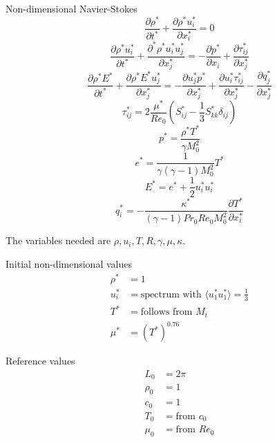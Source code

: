 \documentclass[oneside,a4paper,11pt]{report}
\begin{document}
Non-dimensional Navier-Stokes
\begin{equation}
\frac{\partial \rho^*}{\partial t^*} + \frac{\partial \rho^* u^*_i}{\partial x^*_i} = 0
\end{equation}
\begin{equation}
\frac{\partial \rho^* u^*_i}{\partial t^*} + \frac{\partial^* \rho^* u^*_i u^*_j}{\partial x^*_j} = -\frac{\partial p^*}{\partial x_i} + \frac{\partial \tau^*_{ij}}{\partial x^*_j}
\end{equation}
\begin{equation}
\frac{\partial \rho^* E^*}{\partial t^*} + \frac{\partial \rho^* E^* u^*_j}{\partial x^*_j} = -\frac{\partial u^*_j p^*}{\partial x^*_j} + \frac{\partial u^*_i \tau^*_{ij}}{\partial x^*_j} - \frac{\partial q^*_j}{\partial x^*_j}
\end{equation}
\begin{equation}
\tau^*_{ij} = 2 \frac{\mu^*}{Re_0} \left (S^*_{ij} - \frac{1}{3} S^*_{kk} \delta_{ij} \right )
\end{equation}
\begin{equation}
p^* = \frac{\rho^* T^*}{\gamma M_0^2}
\end{equation}
\begin{equation}
e^* = \frac{1}{\gamma (\gamma - 1) M_0^2} T^*
\end{equation}
\begin{equation}
E^* = e^* + \frac{1}{2} u_i^* u_i^*
\end{equation}
\begin{equation}
q_i^* = - \frac{\kappa^*}{(\gamma - 1) Pr_0 Re_0 M_0^2} \frac{ \partial T^*}{\partial x_i^*}
\end{equation}

\newpage
The variables needed are $\rho, u_i, T, R, \gamma, \mu, \kappa$.

Initial non-dimensional values
\begin{align}
\rho^* &= 1 \nonumber \\
u_i^* &= \text{spectrum with } \langle u^*_1 u^*_1 \rangle = \frac{1}{3} \nonumber \\
T^* &= \text{follows from }M_t \nonumber \\
\mu^* &= \left ( T^* \right)^{0.76}
\end{align}

Reference values
\begin{align}
L_0 &= 2 \pi \nonumber \\
\rho_0 &= 1 \nonumber \\
c_0 &= 1 \nonumber \\
T_0 &= \text{from }c_0 \nonumber \\
\mu_0 &= \text{from } Re_0
\end{align}
\end{document}
